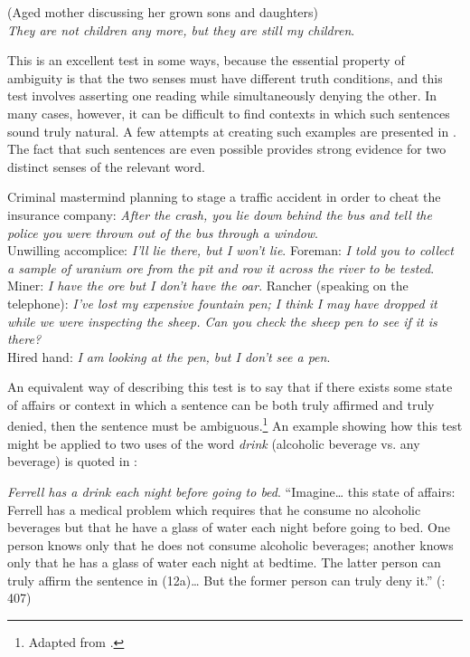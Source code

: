 \ea \label{ex:5.10}
(Aged mother discussing her grown sons and daughters)\\
\textit{They are not children any more, but they are still my children}.
\z


This is an excellent test in some ways, because the essential property of ambiguity is that the two senses must have different truth conditions, and this test involves asserting one reading while simultaneously denying the other. In many cases, however, it can be difficult to find contexts in which such sentences sound truly natural. A few attempts at creating such examples are presented in . The fact that such sentences are even possible provides strong evidence for two distinct senses of the relevant word.


\ea \label{ex:5.11}
\ea  Criminal mastermind planning to stage a traffic accident in order to cheat the insurance company: \textit{After the crash, you lie down behind the bus and tell the police you were thrown out of the bus through a window}.\\
Unwilling accomplice: \textit{I’ll lie there, but I won’t lie}.
\ex   Foreman: \textit{I told you to collect a sample of uranium ore from the pit and row it across the river to be tested}.\\
Miner: \textit{I have the ore but I don’t have the oar}.
\ex   Rancher (speaking on the telephone): \textit{I’ve lost my expensive fountain pen; I think I may have dropped it while we were inspecting the sheep. Can you check the sheep pen to see if it is there?}\\
Hired hand: \textit{I am looking at the pen, but I don’t see a pen}.
\z \z


An equivalent way of describing this test is to say that if there exists some state of affairs or context in which a sentence can be both truly affirmed and truly denied, then the sentence must be ambiguous.\footnote{Adapted from \citet[407]{Gillon1990}.} An example showing how this test might be applied to two uses of the word \textit{drink} (alcoholic beverage vs. any beverage) is quoted in :


\ea \label{ex:5.12}
\ea \textit{Ferrell has a drink each night before going to bed}.
\ex  “Imagine… this state of affairs: Ferrell has a medical problem which requires that he consume no alcoholic beverages but that he have a glass of water each night before going to bed. One person knows only that he does not consume alcoholic beverages; another knows only that he has a glass of water each night at bedtime. The latter person can truly affirm the sentence in (12a)… But the former person can truly deny it.” (\citealt{Gillon1990}: 407)
\z \z


